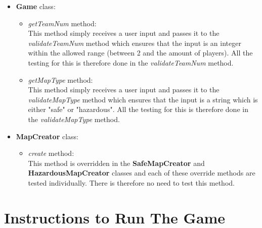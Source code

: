 \documentclass[a4paper,12pt]{extarticle}
\begin{document}
\renewcommand\labelitemii{$\triangleright$}
\begin{itemize}
    \item \textbf{Game} class:\\
    \vspace{-5mm}
    \begin{itemize}
  		\item \textit{getTeamNum} method:\\
  		This method simply receives a user input and passes it to the \textit{validateTeamNum} method 	     		which ensures that the input is an integer within the allowed range (between 2 and the amount of 		players). All the testing for this is therefore done in the \textit{validateTeamNum} method.
  		
  		\item \textit{getMapType} method:\\
  		This method simply receives a user input and passes it to the \textit{validateMapType} method 	     		which ensures that the input is a string which is either "safe" or "hazardous". All the testing 			for this is therefore done in the \textit{validateMapType} method.
  	\end{itemize}
  	\newpage
	
	\item \textbf{MapCreator} class:\\
	\vspace{-5mm}
	\begin{itemize}
		\item \textit{create} method:\\
		This method is overridden in the \textbf{SafeMapCreator} and \textbf{HazardousMapCreator} 					classes and each of these override methods are tested individually. There is therefore no need 				to test this method.
	\end{itemize}
\end{itemize}
\newpage 

\section{Instructions to Run The Game}
\end{document}
